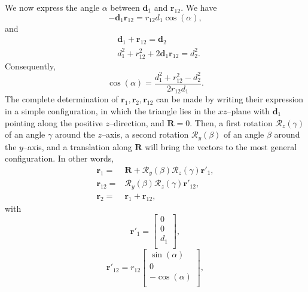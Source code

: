 We now express the angle $\alpha$ between $\mathbf{d}_1$ and $\mathbf{r}_{12}$. We have
\begin{equation}\label{eq73}
-\mathbf{d}_1\mathbf{r}_{12}=r_{12}d_1\cos(\alpha),
\end{equation}
and
\begin{equation}\label{eq74}
\begin{split}
  & \mathbf{d}_1+ \mathbf{r}_{12}=\mathbf{d}_{2}\\
    & d_1^2+r_{12}^2+2\mathbf{d}_1\mathbf{r}_{12}=d_2^2.
\end{split}
\end{equation}
Consequently,
\begin{equation}\label{eq75}
\cos(\alpha)=\frac{d_1^2+r_{12}^2-d_2^2}{2r_{12}d_1}.
\end{equation}
The complete determination of $\mathbf{r}_1,\mathbf{r}_2,\mathbf{r}_{12}$ can be made by writing their expression in a simple configuration, in which the triangle lies in the $xz$--plane with $\mathbf{d}_1$ pointing along the positive $z$--direction, and $\mathbf{R}=0$. Then, a first rotation $\mathcal{R}_z(\gamma)$ of an angle $\gamma$ around the $z$--axis, a second rotation $\mathcal{R}_y(\beta)$ of an angle $\beta$ around the $y$--axis, and a translation along $\mathbf{R}$ will bring the vectors to the most general configuration. In other words,
\begin{equation}\label{eq76}
\begin{split}
\mathbf{r}_1=&\mathbf{R}+\mathcal{R}_y(\beta)\mathcal{R}_z(\gamma)\mathbf{r}'_1,\\
\mathbf{r}_{12}=&\mathcal{R}_y(\beta)\mathcal{R}_z(\gamma)\mathbf{r}'_{12},\\
\mathbf{r}_2=&\mathbf{r}_1+\mathbf{r}_{12},
\end{split}
\end{equation}
with
\begin{equation}\label{eq77}
\mathbf{r}'_1=
\begin{bmatrix}
  0\\
 0\\
 d_1\\
\end{bmatrix},
\end{equation}
\begin{equation}\label{eq78}
\mathbf{r}'_{12}=r_{12}
\begin{bmatrix}
  \sin(\alpha)\\
 0\\
 -\cos(\alpha)\\
\end{bmatrix},
\end{equation}
